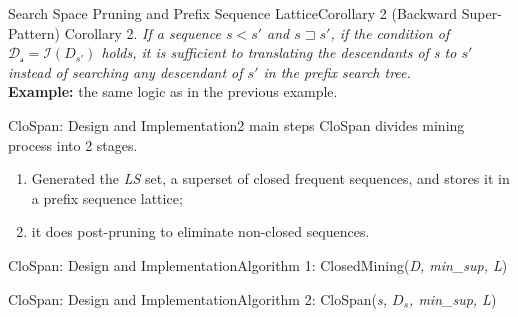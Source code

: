 \documentclass[12pt]{beamer}
\newcommand{\splitline}{\vspace{0.4cm}}
\begin{document}
\begin{frame}{Search Space Pruning and Prefix Sequence Lattice}{Corollary 2 (Backward Super-Pattern)}
Corollary 2. {\it If a sequence $s < s'$ and $s \sqsupset s'$, if the condition of $\mathcal{D_s} = \mathcal{I}(D_{s'})$ holds, it is sufficient to translating the descendants of s to $s'$ instead of searching any descendant of $s'$ in the prefix search tree.}\\
\splitline
{\bf Example:} the same logic as in the previous example.
\end{frame}

\begin{frame}{CloSpan: Design and Implementation}{2 main steps}
CloSpan divides mining process into 2 stages.
\begin{enumerate}
\item Generated the {\it LS} set, a superset of closed frequent sequences, and stores it in a prefix sequence lattice;
\item it does post-pruning to eliminate non-closed sequences.
\end{enumerate}
\end{frame}

\begin{frame}{CloSpan: Design and Implementation}{Algorithm 1: ClosedMining({\it D, min\_sup, L})}
\begin{figure}
\end{figure}
\end{frame}

\begin{frame}{CloSpan: Design and Implementation}{Algorithm 2: CloSpan({\it s, $D_s$, min\_sup, L})}
\begin{figure}
\end{figure}
\end{frame}
\end{document}
